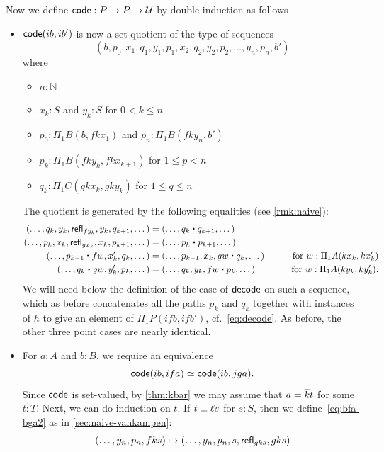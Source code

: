 Now we define $\mathsf{code}:P\to P\to \mathcal{U}$ by double induction as follows
\begin{itemize}
\item $\mathsf{code}(ib,ib')$ is now a set-quotient of the type of sequences
  \[ (b, p_0, x_1, q_1, y_1, p_1, x_2, q_2, y_2, p_2, \dots, y_n, p_n, b') \]
  where
  \begin{itemize}
  \item $n:\mathbb{N}$
  \item $x_k:S$ and $y_k:S$ for $0<k \le n$
  \item $p_0:\Pi_1B(b,f k x_1)$ and $p_n:\Pi_1B(f k y_n, b')$
  \item $p_k:\Pi_1B(fk y_k, fkx_{k+1})$ for $1\le p < n$
  \item $q_k:\Pi_1C(gkx_k, gky_k)$ for $1\le q\le n$
  \end{itemize}
  The quotient is generated by the following equalities (see \autoref{rmk:naive}):
  \begin{alignat*}{2}
    (\dots, q_k, y_k, \refl{fy_k}, y_k, q_{k+1},\dots)
    &= (\dots, q_k\ct q_{k+1},\dots)\\
    (\dots, p_k, x_k, \refl{gx_k}, x_k, p_{k+1},\dots)
    &= (\dots, p_k\ct p_{k+1},\dots)\\
    (\dots, p_{k-1} \ct fw, x_{k}', q_{k}, \dots) &=
    (\dots, p_{k-1}, x_{k}, gw \ct q_{k}, \dots)
    & \qquad\text{for } w:\Pi_1A(kx_{k},kx_{k}')\\
    (\dots, q_k \ct gw, y_k', p_k, \dots) &=
    (\dots, q_k, y_k, fw \ct p_k, \dots)
    & \qquad\text{for } w:\Pi_1A(ky_k, ky_k').
  \end{alignat*}
  We will need below the definition of the case of $\mathsf{decode}$ on such a sequence, which as before concatenates all the paths $p_k$ and $q_k$ together with instances of $h$ to give an element of $\Pi_1P(ifb,ifb')$, cf.~\eqref{eq:decode}.
  As before, the other three point cases are nearly identical.
\item For $a:A$ and $b:B$, we require an equivalence
  \begin{equation}
    \code(ib, ifa) \simeq \code(ib,jga).\label{eq:bfa-bga2}
  \end{equation}
  Since $\mathsf{code}$ is set-valued, by \autoref{thm:kbar} we may assume that $a=\overline{k} t$ for some $t:T$.
  Next, we can do induction on $t$.
  If $t\equiv \ell s$ for $s:S$, then we define~\eqref{eq:bfa-bga2} as in \autoref{sec:naive-vankampen}:
  \begin{align*}
    (\dots, y_n, p_n,fks) &\mapsto (\dots,y_n,p_n,s,\refl{gks},gks)\\

\end{align*}
\end{itemize}

